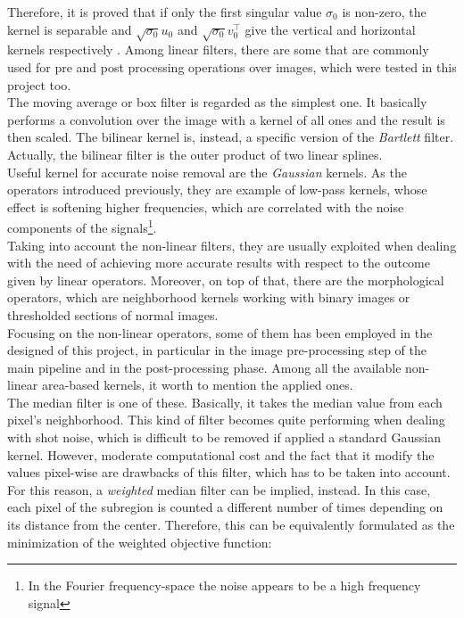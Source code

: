 Therefore, it is proved that if only the first singular value $\sigma_0$ is non-zero, the kernel is separable and $\sqrt{\sigma_0}u_0$ and $\sqrt{\sigma_0}v_0^\top$ give the vertical and horizontal kernels respectively \cite{Szeliski2011}.
Among linear filters, there are some that are commonly used for pre and post processing operations over images, which were tested in this project too.\\
The moving average or box filter is regarded as the simplest one. 
It basically performs a convolution over the image with a kernel of all ones and the result is then scaled. 
The bilinear kernel is, instead, a specific version of the \textit{Bartlett} filter. 
Actually, the bilinear filter is the outer product of two linear splines.\\
Useful kernel for accurate noise removal are the \textit{Gaussian} kernels.
As the operators introduced previously, they are example of low-pass kernels, whose effect is softening higher frequencies, which are correlated with the noise components of the signals\footnote{In the Fourier frequency-space the noise appears to be a high frequency signal}. \\
Taking into account the non-linear filters, they are usually exploited when dealing with the need of achieving more accurate results with respect to the outcome given by linear operators.
Moreover, on top of that, there are the morphological operators, which are neighborhood kernels working with binary images or thresholded sections of normal images.\\
Focusing on the non-linear operators, some of them has been employed in the designed of this project, in particular in the image pre-processing step of the main pipeline and in the post-processing phase.
Among all the available non-linear area-based kernels, it worth to mention the applied ones.\\
The median filter is one of these. 
Basically, it takes the median value from each pixel's neighborhood.
This kind of filter becomes quite performing when dealing with shot noise, which is difficult to be removed if applied a standard Gaussian kernel.
However, moderate computational cost and the fact that it modify the values pixel-wise are drawbacks of this filter, which has to be taken into account.
For this reason, a \textit{weighted} median filter can be implied, instead. 
In this case, each pixel of the subregion is counted a different number of times depending on its distance from the center.
Therefore, this can be equivalently formulated as the minimization of the weighted objective function:

